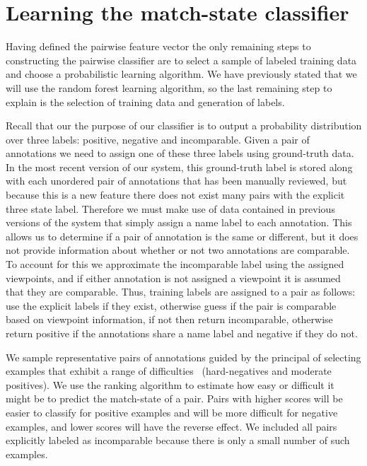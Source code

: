 \section{Learning the match-state classifier}
\label{sec:learnclf}

Having defined the pairwise feature vector the only remaining steps to
  constructing the pairwise classifier are to select a sample of labeled
  training data and choose a probabilistic learning algorithm.
We have previously stated that we will use the random forest learning
  algorithm, so the last remaining step to explain is the selection of training
  data and generation of labels.

Recall that our the purpose of our classifier is to output a probability
  distribution over three labels:
positive, negative and incomparable.
Given a pair of annotations we need to assign one of these three labels using
  ground-truth data.
In the most recent version of our system, this ground-truth label is stored
  along with each unordered pair of annotations that has been manually reviewed,
  but because this is a new feature there does not exist many pairs with the
  explicit three state label.
Therefore we must make use of data contained in previous versions of the
  system that simply assign a name label to each annotation.
This allows us to determine if a pair of annotation is the same or different,
  but it does not provide information about whether or not two annotations are
  comparable.
To account for this we approximate the incomparable label using the assigned
  viewpoints, and if either annotation is not assigned a viewpoint it is assumed
  that they are comparable.
Thus, training labels are assigned to a pair as follows:
use the explicit labels if they exist, otherwise guess if the pair is
  comparable based on viewpoint information, if not then return incomparable,
  otherwise return positive if the annotations share a name label and negative
  if they do not.

We sample representative pairs of annotations guided by the principal of
  selecting examples that exhibit a range of
  difficulties~\cite{shi_embedding_2016} (\eg hard-negatives and moderate
  positives).
We use the ranking algorithm to estimate how easy or difficult it might be to
  predict the match-state of a pair.
Pairs with higher scores will be easier to classify for positive examples and
  will be more difficult for negative examples, and lower scores will have the
  reverse effect.
We included all pairs explicitly labeled as incomparable because there is only
  a small number of such examples.

